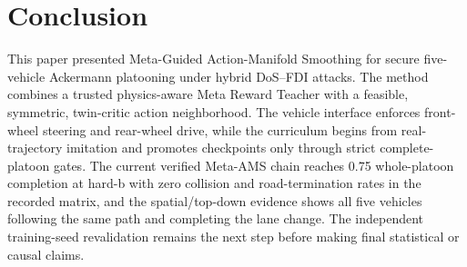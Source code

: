 \documentclass[lettersize,journal]{IEEEtran}
\begin{document}
\section{Conclusion}
This paper presented Meta-Guided Action-Manifold Smoothing for secure five-vehicle Ackermann platooning under hybrid DoS--FDI attacks. The method combines a trusted physics-aware Meta Reward Teacher with a feasible, symmetric, twin-critic action neighborhood. The vehicle interface enforces front-wheel steering and rear-wheel drive, while the curriculum begins from real-trajectory imitation and promotes checkpoints only through strict complete-platoon gates. The current verified Meta-AMS chain reaches 0.75 whole-platoon completion at hard-b with zero collision and road-termination rates in the recorded matrix, and the spatial/top-down evidence shows all five vehicles following the same path and completing the lane change. The independent training-seed revalidation remains the next step before making final statistical or causal claims.



\end{document}

